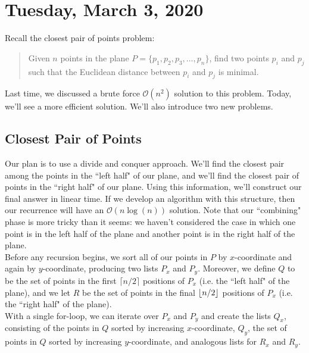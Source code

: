 \newpage
\section{Tuesday, March 3, 2020}

Recall the closest pair of points problem:

\begin{quote}
    Given $n$ points in the plane $P = \{p_1, p_2, p_3, \ldots, p_n\}$, find two points $p_i$ and $p_j$ such that the Euclidean distance between $p_i$ and $p_j$ is minimal. 
\end{quote}


Last time, we discussed a brute force $\mathcal{O}(n^2)$ solution to this problem. Today, we'll see a more efficient solution. We'll also introduce two new problems.

\subsection{Closest Pair of Points}

Our plan is to use a divide and conquer approach. We'll find the closest pair among the points in the ``left half" of our plane, and we'll find the closest pair of points in the ``right half" of our plane. Using this information, we'll construct our final answer in linear time. If we develop an algorithm with this structure, then our recurrence will have an $\mathcal{O}(n\log(n))$ solution. Note that our ``combining" phase is more tricky than it seems: we haven't considered the case in which one point is in the left half of the plane and another point is in the right half of the plane.  \\

Before any recursion begins, we sort all of our points in $P$ by $x$-coordinate and again by $y$-coordinate, producing two lists $P_x$ and $P_y$. Moreover, we define $Q$ to be the set of points in the first $\lceil n/2 \rceil$ positions of $P_x$ (i.e. the ``left half" of the plane), and we let $R$ be the set of points in the final $\left\lfloor n/2 \right\rfloor$ positions of $P_x$ (i.e. the ``right half" of the plane). \\


With a single for-loop, we can iterate over $P_x$ and $P_y$ and create the lists $Q_x$, consisting of the points in $Q$ sorted by increasing $x$-coordinate, $Q_y$, the set of points in $Q$ sorted by increasing $y$-coordinate, and analogous lists for $R_x$ and $R_y.$ \\

